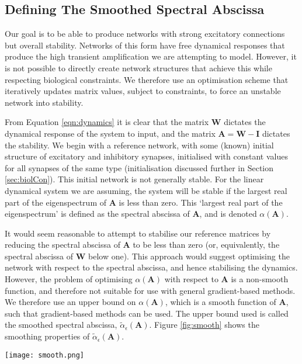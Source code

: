 \documentclass[12pt, a4paper]{article}
\begin{document}
\subsection{Defining The Smoothed Spectral Abscissa}

\FloatBarrier
Our goal is to be able to produce networks with strong excitatory connections but overall stability.  Networks of this form have free dynamical responses that produce the high transient amplification we are attempting to model.  However, it is not possible to directly create network structures that achieve this while respecting biological constraints. We therefore use an optimisation scheme that iteratively updates matrix values, subject to constraints, to force an unstable network into stability. 

From Equation \ref{eqn:dynamics} it is clear that the matrix $\mathbf{W}$ dictates the dynamical response of the system to input, and the matrix $\mathbf{A} = \mathbf{W} - \mathbf{I}$ dictates the stability.  We begin with a reference network, with some (known) initial structure of excitatory and inhibitory synapses, initialised with constant values for all synapses of the same type (initialisation discussed further in Section \ref{sec:biolCon}).  This initial network is not generally stable.  For the linear dynamical system we are assuming, the system will be stable if the largest real part of the eigenspectrum of $\mathbf{A}$ is less than zero.  This `largest real part of the eigenspectrum' is defined as the spectral abscissa of $\mathbf{A}$, and is denoted $\alpha(\mathbf{A})$.

It would seem reasonable to attempt to stabilise our reference matrices by reducing the spectral abscissa of $\mathbf{A}$ to be less than zero (or, equivalently, the spectral abscissa of $\mathbf{W}$ below one).  This approach would suggest optimising the network with respect to the spectral abscissa, and hence stabilising the dynamics.  However, the problem of optimising $\alpha(\mathbf{A})$ with respect to $\mathbf{A}$ is a non-smooth function, and therefore not suitable for use with general gradient-based methods.  We therefore use an upper bound on $\alpha(\mathbf{A})$, which is a smooth function of $\mathbf{A}$, such that gradient-based methods can be used.  The upper bound used is called the smoothed spectral abscissa, $\tilde{\alpha}_\epsilon(\mathbf{A})$. Figure \ref{fig:smooth} shows the smoothing properties of $\tilde{\alpha}_\epsilon(\mathbf{A})$.

\begin{SCfigure}
    \centering
    \texttt{[image: smooth.png]}
    \caption{Variation of $\alpha(\mathbf{X})$ and $\tilde{\alpha}_\epsilon(\mathbf{X})$ with the value of an element of the example matrix, $\mathbf{X}$.  The non-linearity in $\alpha(\mathbf{X})$ has been smoothed out such that $\tilde{\alpha}_\epsilon(\mathbf{X})$ is a smooth function of the element value.}
    \label{fig:smooth}
\end{SCfigure}
    
\end{document}
